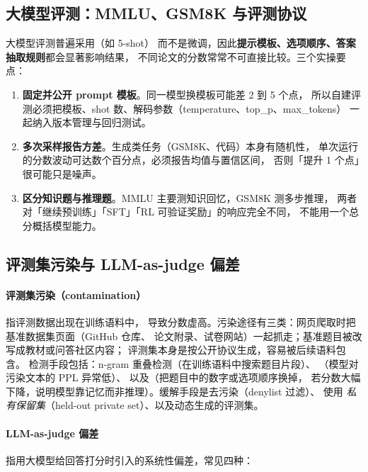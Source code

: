 \subsection{大模型评测：MMLU、GSM8K 与评测协议}

大模型评测普遍采用（如 5-shot）
而不是微调，因此\textbf{提示模板、选项顺序、答案抽取规则}都会显著影响结果，
不同论文的分数常常不可直接比较。三个实操要点：

\begin{enumerate}
  \item \textbf{固定并公开 prompt 模板}。同一模型换模板可能差 2 到 5 个点，
        所以自建评测必须把模板、shot 数、解码参数（temperature、top\_p、max\_tokens）
        一起纳入版本管理与回归测试。
  \item \textbf{多次采样报告方差}。生成类任务（GSM8K、代码）本身有随机性，
        单次运行的分数波动可达数个百分点，必须报告均值与置信区间，
        否则「提升 1 个点」很可能只是噪声。
  \item \textbf{区分知识题与推理题}。MMLU 主要测知识回忆，GSM8K 测多步推理，
        两者对「继续预训练」「SFT」「RL 可验证奖励」的响应完全不同，
        不能用一个总分概括模型能力。
\end{enumerate}

\subsection{评测集污染与 LLM-as-judge 偏差}

\paragraph{评测集污染（contamination）} 指评测数据出现在训练语料中，
导致分数虚高。污染途径有三类：网页爬取时把基准数据集页面（GitHub 仓库、
论文附录、试卷网站）一起抓走；基准题目被改写成教材或问答社区内容；
评测集本身是按公开协议生成，容易被后续语料包含。
检测手段包括：n-gram 重叠检测（在训练语料中搜索题目片段）、
（模型对污染文本的 PPL 异常低）、
以及（把题目中的数字或选项顺序换掉，
若分数大幅下降，说明模型靠记忆而非推理）。缓解手段是去污染（denylist 过滤）、
使用 \emph{私有保留集}（held-out private set）、以及动态生成的评测集。

\paragraph{LLM-as-judge 偏差} 指用大模型给回答打分时引入的系统性偏差，常见四种：

